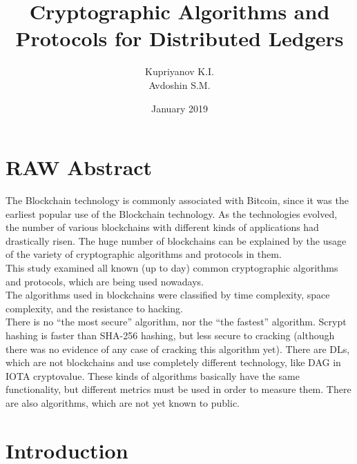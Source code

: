 \documentclass[12pt]{article}
\title{Cryptographic Algorithms and Protocols for Distributed Ledgers}
\author{Kupriyanov K.I.\\Avdoshin S.M.}
\date{January 2019}
\begin{document}
\maketitle

\section*{RAW Abstract}
The Blockchain technology is commonly associated with Bitcoin, since it was the
earliest popular use of the Blockchain technology. As the technologies evolved,
the number of various blockchains with different kinds of applications had
drastically risen. The huge number of blockchains can be explained by the usage
of the variety of cryptographic algorithms and protocols in them.\\
This study examined all known (up to day) common cryptographic algorithms and
protocols, which are being used nowadays.\\
The algorithms used in blockchains were classified by time complexity, space
complexity, and the resistance to hacking.\\
There is no ``the most secure'' algorithm, nor the ``the fastest'' algorithm.
Scrypt hashing is faster than SHA-256 hashing, but less secure to cracking
(although there was no evidence of any case of cracking this algorithm yet).
There are DLs, which are not blockchains and use completely different
technology, like DAG in IOTA cryptovalue. These kinds of algorithms basically
have the same functionality, but different metrics must be used in order to
measure them. There are also algorithms, which are not yet known to public.\\

\section{Introduction}
\end{document}
